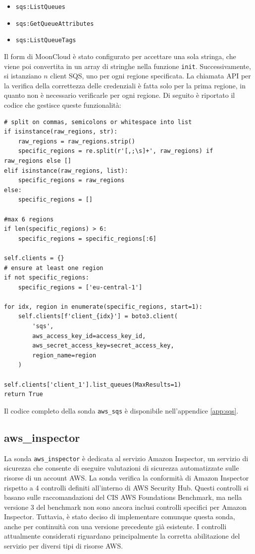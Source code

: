 \begin{itemize}
    \item \texttt{sqs:ListQueues}
    \item \texttt{sqs:GetQueueAttributes}
    \item \texttt{sqs:ListQueueTags}
\end{itemize}

Il form di MoonCloud è stato configurato per accettare una sola stringa, che viene poi convertita in un array di stringhe nella funzione \texttt{init}. Successivamente, si istanziano $n$ client SQS, uno per ogni regione specificata. La chiamata API per la verifica della correttezza delle credenziali è fatta solo per la prima regione, in quanto non è necessario verificarle per ogni regione. Di seguito è riportato il codice che gestisce queste funzionalità:

\begin{lstlisting}[style=mypython, caption={Parte della funzione \texttt{init} per la sonda \texttt{aws\_sqs}}]
# split on commas, semicolons or whitespace into list
if isinstance(raw_regions, str):
    raw_regions = raw_regions.strip()
    specific_regions = re.split(r'[,;\s]+', raw_regions) if raw_regions else []
elif isinstance(raw_regions, list):
    specific_regions = raw_regions
else:
    specific_regions = []

#max 6 regions
if len(specific_regions) > 6:
    specific_regions = specific_regions[:6]

self.clients = {}
# ensure at least one region
if not specific_regions:
    specific_regions = ['eu-central-1']

for idx, region in enumerate(specific_regions, start=1):
    self.clients[f'client_{idx}'] = boto3.client(
        'sqs',
        aws_access_key_id=access_key_id,
        aws_secret_access_key=secret_access_key,
        region_name=region
    )

self.clients['client_1'].list_queues(MaxResults=1)
return True
\end{lstlisting}

Il codice completo della sonda \texttt{aws\_sqs} è disponibile nell'appendice \ref{app:sqs}.

\subsection{aws\_inspector}
\label{sec:inspector}

La sonda \texttt{aws\_inspector} è dedicata al servizio Amazon Inspector, un servizio di sicurezza che consente di eseguire valutazioni di sicurezza automatizzate sulle risorse di un account AWS. La sonda verifica la conformità di Amazon Inspector rispetto a 4 controlli definiti all'interno di AWS Security Hub. Questi controlli si basano sulle raccomandazioni del CIS AWS Foundations Benchmark, ma nella versione 3 del benchmark non sono ancora inclusi controlli specifici per Amazon Inspector. Tuttavia, è stato deciso di implementare comunque questa sonda, anche per continuità con una versione precedente già esistente. I controlli attualmente considerati riguardano principalmente la corretta abilitazione del servizio per diversi tipi di risorse AWS.

